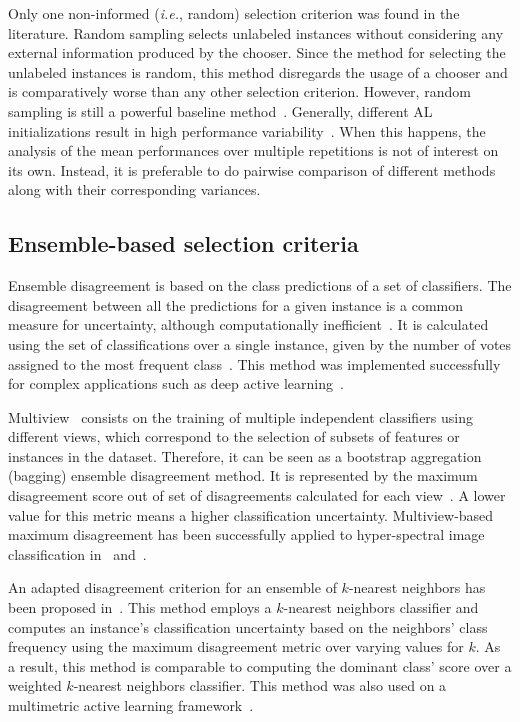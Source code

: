 \documentclass[preprint,12pt]{elsarticle}
\begin{document}
Only one non-informed (\textit{i.e.}, random) selection criterion was found in
the literature. Random sampling selects unlabeled instances without
considering any external information produced by the chooser. Since the method
for selecting the unlabeled instances is random, this method disregards the
usage of a chooser and is comparatively worse than any other selection
criterion. However, random sampling is still a powerful baseline
method~\cite{Cawley2011}. Generally, different AL initializations result in
high performance variability~\cite{Kottke2017}. When this happens, the
analysis of the mean performances over multiple repetitions is not of interest
on its own. Instead, it is preferable to do pairwise comparison of different
methods along with their corresponding variances. 

\subsection{Ensemble-based selection criteria}

Ensemble disagreement is based on the class predictions of a set of
classifiers. The disagreement between all the predictions for a given
instance is a common measure for uncertainty, although computationally
inefficient~\cite{Ruzicka2020,Pasolli2016}. It is calculated using the set of
classifications over a single instance, given by the number of votes
assigned to the most frequent class~\cite{Shrivastava2021}. This method was
implemented successfully for complex applications such as deep active
learning~\cite{Ruzicka2020}.

Multiview~\cite{Muslea2006} consists on the training of multiple independent
classifiers using different views, which correspond to the selection of subsets
of features or instances in the dataset. Therefore, it can be seen as a
bootstrap aggregation (bagging) ensemble disagreement method. It is represented
by the maximum disagreement score out of set of disagreements calculated for
each view~\cite{Shrivastava2021}. A lower value for this metric means a higher
classification uncertainty. Multiview-based maximum disagreement has been
successfully applied to hyper-spectral image classification in~\cite{Di2012}
and~\cite{Zhou2014}.

An adapted disagreement criterion for an ensemble of $k$-nearest neighbors has
been proposed in~\cite{Pasolli2016}. This method employs a $k$-nearest
neighbors classifier and computes an instance's classification uncertainty
based on the neighbors' class frequency using the maximum disagreement metric
over varying values for $k$. As a result, this method is comparable to
computing the dominant class' score over a weighted $k$-nearest neighbors
classifier. This method was also used on a multimetric active learning
framework~\cite{Zhang2016}.
\end{document}
